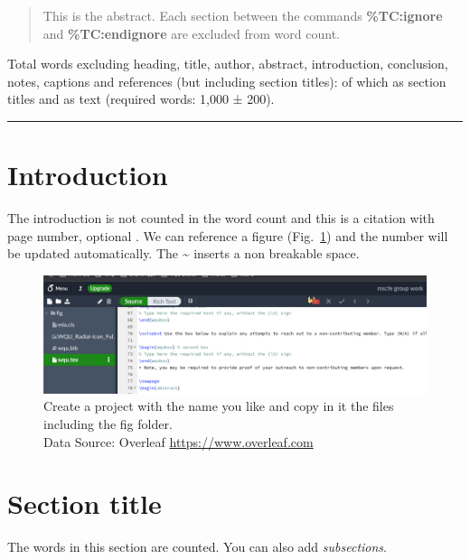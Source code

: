 \documentclass[mla8]{mla}
\newcommand\wordcount{}
\newcommand\wordcounts{}
\newcommand\wordcountt{}
\providecommand{\keywords}[1]
{
  \small	
  \textbf{\textit{Keywords: }} #1
}
\begin{document}
\begin{paper}
\newpage
\begin{abstract}

This is the abstract. Each section between the commands \textbf{\%TC:ignore} and \textbf{\%TC:endignore} are excluded from word count.
\end{abstract}

\bigskip

Total words excluding heading, title, author, abstract, introduction, conclusion, notes, captions and references (but including section titles): \textbf{\wordcount} of which \wordcounts as section titles and \wordcountt as text (required words: 1,000 ± 200).

\noindent\rule[0.5ex]{\linewidth}{1pt}

\setlength{\parindent}{2em}
\section*{Introduction}
The introduction is not counted in the word count and this is a citation with page number, optional \parencite[p.~200]{mishkin_eakins_2018}. We can reference a figure (Fig.~\ref{fig:overleaf}) and the number will be updated automatically. The \textbf{\textasciitilde} inserts a non breakable space.
\begin{figure}[H]
	\centering
	\includegraphics[width=\columnwidth]{fig/overleaf.png}
	\caption{Create a project with the name you like and copy in it the files including the fig folder.\\ Data Source: Overleaf \href{https://www.overleaf.com?r=049a7499&rm=d&rs=b}{https://www.overleaf.com}}
	\label{fig:overleaf}
\end{figure}




\section*{Section title}
The words in this section are counted. You can also add \textit{subsections}.

\end{paper}
\end{document}
